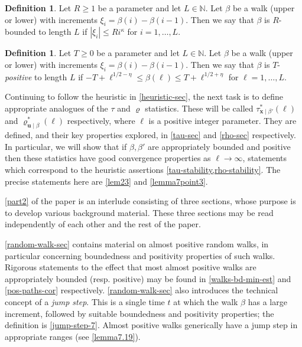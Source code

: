 \documentclass[11pt,reqno]{amsart}
\numberwithin{equation}{section}
\theoremstyle{definition}
\newtheorem{definition}[theorem]{Definition}
\theoremstyle{remark}
\newcommand{\mbf}{\mathbf}
\renewcommand{\le}{\leqslant}
\renewcommand{\ge}{\geqslant}
\newcommand\N{\mathbb{N}}
\begin{document}
\begin{definition}\label{bounded-walk-def}
Let $R \ge 1$ be a parameter and let $L \in \N$. Let $\beta$ be a walk (upper or lower) with increments $\xi_i = \beta(i) - \beta(i - 1)$. Then we say that $\beta$ is $R$-bounded to length $L$ if $|\xi_i| \le Ri^{\kappa}$ for $i = 1,\dots, L$. 
\end{definition}

\begin{definition}\label{good-walk-def}
Let $T \ge 0$ be a parameter and let $L \in \N$. Let $\beta$ be a walk (upper or lower) with increments $\xi_i = \beta(i) - \beta(i - 1)$. Then we say that $\beta$ is $T$-\emph{positive} to length $L$ if $-T + \ell^{1/2 - \eta} \le \beta(\ell) \le T + \ell^{1/2 + \eta}$
for $\ell = 1,\dots, L$.
\end{definition}


Continuing to follow the heuristic in \cref{heuristic-sec}, the next task is to define appropriate analogues of the $\tau$ and $\varrho$ statistics. These will be called $\tau^*_{\mbf{x} \mid \beta'}(\ell)$ and $\varrho^*_{\mbf{u} \mid \beta}(\ell)$ respectively, where $\ell$ is a positive integer parameter. They are defined, and their key properties explored, in \cref{tau-sec} and \cref{rho-sec} respectively. In particular, we will show that if $\beta,\beta'$ are appropriately bounded and positive then these statistics have good convergence properties as $\ell \rightarrow \infty$, statements which correspond to the heuristic assertions \cref{tau-stability,rho-stability}. The precise statements here are \cref{lem23} and \cref{lemma7point3}.\vspace*{10pt}

\cref{part2} of the paper is an interlude consisting of three sections, whose purpose is to develop various background material. These three sections may be read independently of each other and the rest of the paper.

\cref{random-walk-sec} contains material on almost positive random walks, in particular concerning boundedness and positivity properties of such walks. Rigorous statements to the effect that most almost positive walks are appropriately bounded (resp. positive) may be found in \cref{walks-bd-min-est} and \cref{pos-paths-cor} respectively. \cref{random-walk-sec} also introduces the technical concept of a \emph{jump step}. This is a single time $t$ at which the walk $\beta$ has a large increment, followed by suitable boundedness and positivity properties; the definition is \cref{jump-step-7}. Almost positive walks generically have a jump step in appropriate ranges (see \cref{lemma7.19}). 
\end{document}
